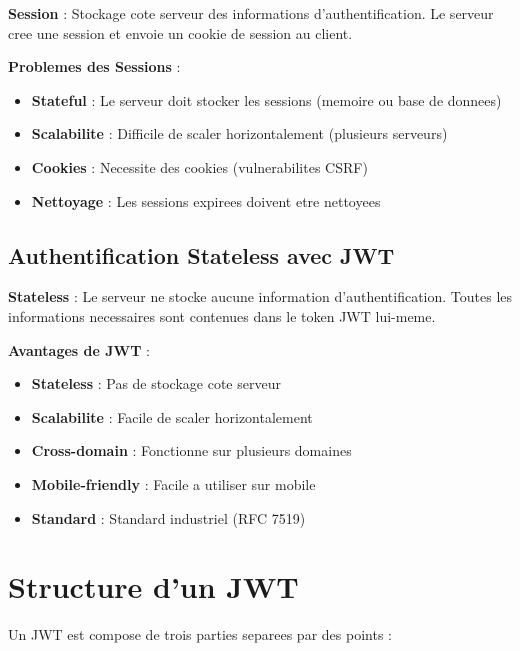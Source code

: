 \documentclass[a4paper,12pt]{book}
\begin{document}
\begin{definitionbox}
    \textbf{Session} : Stockage cote serveur des informations d'authentification. Le serveur cree une session et envoie un cookie de session au client.
\end{definitionbox}

\textbf{Problemes des Sessions} :
\begin{itemize}
    \item \textbf{Stateful} : Le serveur doit stocker les sessions (memoire ou base de donnees)
    \item \textbf{Scalabilite} : Difficile de scaler horizontalement (plusieurs serveurs)
    \item \textbf{Cookies} : Necessite des cookies (vulnerabilites CSRF)
    \item \textbf{Nettoyage} : Les sessions expirees doivent etre nettoyees
\end{itemize}

\subsection{Authentification Stateless avec JWT}

\begin{definitionbox}
    \textbf{Stateless} : Le serveur ne stocke aucune information d'authentification. Toutes les informations necessaires sont contenues dans le token JWT lui-meme.
\end{definitionbox}

\textbf{Avantages de JWT} :
\begin{itemize}
    \item \textbf{Stateless} : Pas de stockage cote serveur
    \item \textbf{Scalabilite} : Facile de scaler horizontalement
    \item \textbf{Cross-domain} : Fonctionne sur plusieurs domaines
    \item \textbf{Mobile-friendly} : Facile a utiliser sur mobile
    \item \textbf{Standard} : Standard industriel (RFC 7519)
\end{itemize}

\section{Structure d'un JWT}

Un JWT est compose de trois parties separees par des points :
\end{document}
